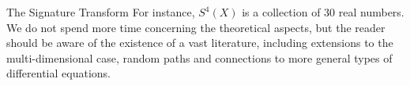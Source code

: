 \documentclass[twocolumn,9pt]{article}
\theoremstyle{definition}
\theoremstyle{remark}
\begin{document}
\begin{section}{The Signature Transform}
For instance, $S^4(X)$ is a collection of $30$ real numbers.
We do not spend more time concerning the theoretical aspects,
but the reader should be aware of the existence of a vast literature,
including extensions to the multi-dimensional case, random paths
and connections to more general types of differential equations.

\end{section}
\end{document}

